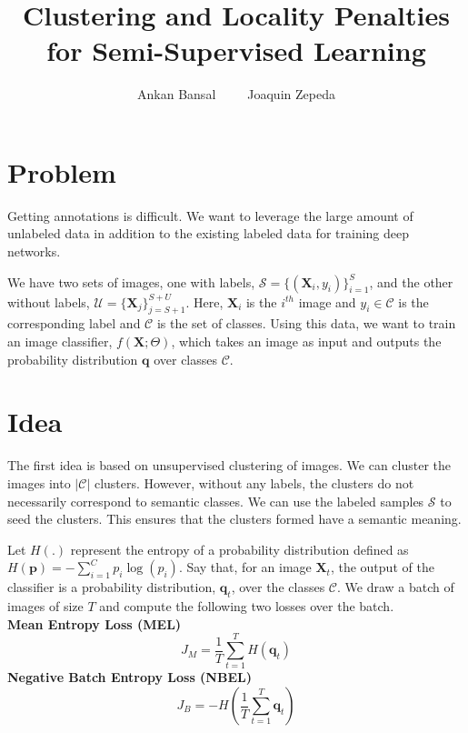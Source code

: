 \documentclass[runningheads]{llncs}
\begin{document}
%
\title{Clustering and Locality Penalties for Semi-Supervised Learning} 

%
\author{Ankan Bansal~~~~~Joaquin Zepeda}

%
\maketitle              %

\section{Problem}
Getting annotations is difficult. We want to leverage the large amount of unlabeled data in addition
to the existing labeled data for training deep networks. 

We have two sets of images, one with labels, $\mathcal{S} = \{(\mathbf{X}_i, y_i)\}_{i=1}^S$, and 
the other without labels, $\mathcal{U} = \{\mathbf{X}_j\}_{j=S+1}^{S+U}$. Here, $\mathbf{X}_i$ is the
$i^{th}$ image and $y_i \in \mathcal{C}$ is the corresponding label and $\mathcal{C}$ is the set of
classes.  Using this data, we want to train an image classifier, $f(\mathbf{X}; \Theta)$,
which takes an image as input and outputs the probability distribution $\mathbf{q}$ over classes
$\mathcal{C}$.


\section{Idea}
The first idea is based on unsupervised clustering of images. We can cluster the images into
$|\mathcal{C}|$ clusters. However, without any labels, the clusters do not necessarily
correspond to semantic classes. We can use the labeled samples $\mathcal{S}$ to seed the clusters.
This ensures that the clusters formed have a semantic meaning.

Let $H(.)$ represent the entropy of a probability distribution defined as $H(\mathbf{p}) =
-\sum_{i=1}^{C}p_i \log(p_i)$.  Say that, for an image $\mathbf{X}_t$, the output of the classifier
is a probability distribution, $\mathbf{q}_t$, over the classes $\mathcal{C}$. We draw a batch of
images of size $T$ and compute the following two losses over the batch.\\
\textbf{Mean Entropy Loss (MEL)}
\begin{equation}
	J_M = \frac{1}{T}\sum_{t=1}^{T}H(\mathbf{q}_t)
\end{equation}
\textbf{Negative Batch Entropy Loss (NBEL)}
\begin{equation}
	J_B = -H(\frac{1}{T}\sum_{t=1}^{T}\mathbf{q}_t)
\end{equation}
\end{document}
